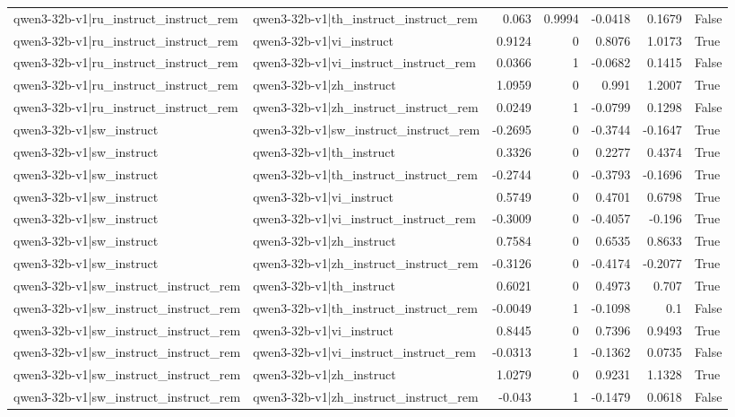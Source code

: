 \begin{table}
\begin{tabular}{l l r r r r l}
qwen3-32b-v1|ru_instruct_instruct_rem & qwen3-32b-v1|th_instruct_instruct_rem & 0.063 & 0.9994 & -0.0418 & 0.1679 & False \\
qwen3-32b-v1|ru_instruct_instruct_rem & qwen3-32b-v1|vi_instruct & 0.9124 & 0 & 0.8076 & 1.0173 & True \\
qwen3-32b-v1|ru_instruct_instruct_rem & qwen3-32b-v1|vi_instruct_instruct_rem & 0.0366 & 1 & -0.0682 & 0.1415 & False \\
qwen3-32b-v1|ru_instruct_instruct_rem & qwen3-32b-v1|zh_instruct & 1.0959 & 0 & 0.991 & 1.2007 & True \\
qwen3-32b-v1|ru_instruct_instruct_rem & qwen3-32b-v1|zh_instruct_instruct_rem & 0.0249 & 1 & -0.0799 & 0.1298 & False \\
qwen3-32b-v1|sw_instruct & qwen3-32b-v1|sw_instruct_instruct_rem & -0.2695 & 0 & -0.3744 & -0.1647 & True \\
qwen3-32b-v1|sw_instruct & qwen3-32b-v1|th_instruct & 0.3326 & 0 & 0.2277 & 0.4374 & True \\
qwen3-32b-v1|sw_instruct & qwen3-32b-v1|th_instruct_instruct_rem & -0.2744 & 0 & -0.3793 & -0.1696 & True \\
qwen3-32b-v1|sw_instruct & qwen3-32b-v1|vi_instruct & 0.5749 & 0 & 0.4701 & 0.6798 & True \\
qwen3-32b-v1|sw_instruct & qwen3-32b-v1|vi_instruct_instruct_rem & -0.3009 & 0 & -0.4057 & -0.196 & True \\
qwen3-32b-v1|sw_instruct & qwen3-32b-v1|zh_instruct & 0.7584 & 0 & 0.6535 & 0.8633 & True \\
qwen3-32b-v1|sw_instruct & qwen3-32b-v1|zh_instruct_instruct_rem & -0.3126 & 0 & -0.4174 & -0.2077 & True \\
qwen3-32b-v1|sw_instruct_instruct_rem & qwen3-32b-v1|th_instruct & 0.6021 & 0 & 0.4973 & 0.707 & True \\
qwen3-32b-v1|sw_instruct_instruct_rem & qwen3-32b-v1|th_instruct_instruct_rem & -0.0049 & 1 & -0.1098 & 0.1 & False \\
qwen3-32b-v1|sw_instruct_instruct_rem & qwen3-32b-v1|vi_instruct & 0.8445 & 0 & 0.7396 & 0.9493 & True \\
qwen3-32b-v1|sw_instruct_instruct_rem & qwen3-32b-v1|vi_instruct_instruct_rem & -0.0313 & 1 & -0.1362 & 0.0735 & False \\
qwen3-32b-v1|sw_instruct_instruct_rem & qwen3-32b-v1|zh_instruct & 1.0279 & 0 & 0.9231 & 1.1328 & True \\
qwen3-32b-v1|sw_instruct_instruct_rem & qwen3-32b-v1|zh_instruct_instruct_rem & -0.043 & 1 & -0.1479 & 0.0618 & False \\

\end{tabular}
\end{table}
